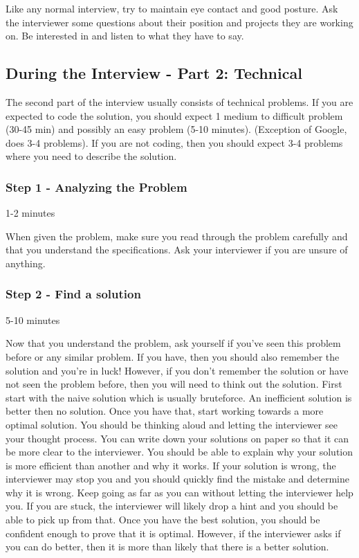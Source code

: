 \documentclass[11pt,oneside]{book}
\begin{document}
Like any normal interview, try to maintain eye contact and good posture. Ask the interviewer some questions about their position and projects they are working on. Be interested in and listen to what they have to say.

\subsection{During the Interview - Part 2: Technical}

The second part of the interview usually consists of technical problems. If you are expected to code
    the solution, you should expect 1 medium to difficult problem (30-45 min) and possibly an easy problem 
    (5-10 minutes). (Exception of Google, does 3-4 problems). If you are not coding, then you should expect
    3-4 problems where you need to describe the solution.

\subsubsection{Step 1 - Analyzing the Problem}

1-2 minutes

When given the problem, make sure you read through 
    the problem carefully and that you understand the specifications. Ask your interviewer if you are unsure 
    of anything.

\subsubsection{Step 2 - Find a solution}

5-10 minutes

Now that you understand the problem, ask yourself if you've seen this problem before or 
    any similar problem. If you have, then you should also remember the solution and you're in luck! 
    However, if you don't remember the solution or have not seen the problem before, then you will
    need to think out the solution. First start with the naive solution which is usually bruteforce. 
    An inefficient solution is better then no solution. Once you have that, start working towards a 
    more optimal solution. You should be thinking aloud and letting the interviewer see your thought process. 
    You can write down your solutions on paper so that it can be more clear to the interviewer. You should be able
    to explain why your solution is more efficient than another and why it works. If your solution 
    is wrong, the interviewer may stop you and you should quickly find the mistake and determine
    why it is wrong. Keep going as far as you can without letting the interviewer help you. If you are stuck,
    the interviewer will likely drop a hint and you should be able to pick up from that. Once you have the best
    solution, you should be confident enough to prove that it is optimal. However, if the interviewer asks if you can do better,
    then it is more than likely that there is a better solution.
\end{document}
